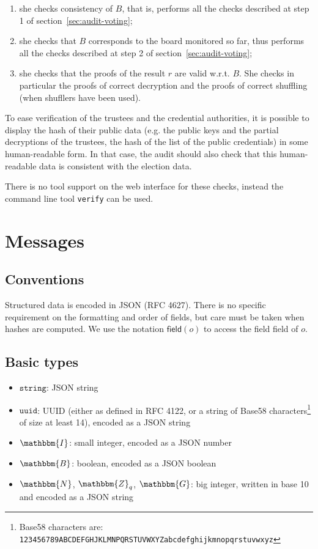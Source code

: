 \documentclass[a4paper]{article}
\newcommand{\G}{\mathbbm{G}}
\newcommand{\Z}{\mathbbm{Z}}
\newcommand{\N}{\mathbbm{N}}
\newcommand{\I}{\mathbbm{I}}
\newcommand{\B}{\mathbbm{B}}
\newcommand{\jstring}{\texttt{string}}
\newcommand{\uuid}{\texttt{uuid}}
\begin{document}
  \begin{enumerate}
  \item she checks consistency of $B$, that is, performs all
    the checks described at step 1 of section~\ref{sec:audit-voting};
  \item she checks that $B$ corresponds to the board
      monitored so far, thus performs all
    the checks described at step 2 of section~\ref{sec:audit-voting};
  \item she checks that the proofs of the result $r$ are valid
    w.r.t. $B$.
She checks in particular the proofs of correct decryption and the
proofs of correct shuffling (when shufllers have been used).
\end{enumerate}
To ease verification of the trustees and the credential authorities,
it is possible to display the hash of their public data (e.g. the
public keys and the partial decryptions of the trustees, the hash of
the list of the public credentials) in some human-readable form. In
that case, the audit should also check that this human-readable data is
consistent with the election data.

There is no tool support on the web interface for these checks,
instead the command line tool \texttt{verify} can be used.

\section{Messages}
\label{messages}

\subsection{Conventions}

Structured data is encoded in JSON (RFC 4627). There is no specific
requirement on the formatting and order of fields, but care must be
taken when hashes are computed. We use the notation
$\textsf{field}(o)$ to access the field \textsf{field} of $o$.

\subsection{Basic types}
\label{basic-types}

\begin{itemize}
\item $\jstring$: JSON string
\item $\uuid$: UUID (either as defined in RFC 4122, or a string of
  Base58 characters\footnote{Base58 characters are:
    \texttt{123456789ABCDEFGHJKLMNPQRSTUVWXYZabcdefghijkmnopqrstuvwxyz}}
  of size at least 14), encoded as a JSON string
\item $\I$: small integer, encoded as a JSON number
\item $\B$: boolean, encoded as a JSON boolean
\item $\N$, $\Z_q$, $\G$: big integer, written in base 10 and encoded as a
  JSON string
\end{itemize}
\end{document}

